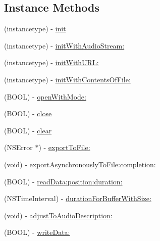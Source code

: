 \subsection*{Instance Methods}
\begin{DoxyCompactItemize}
\item 
(instancetype) -\/ \hyperlink{interface_s_e_audio_stream_a3399ff27e1d1189946e698ebd1449d08}{init}
\item 
(instancetype) -\/ \hyperlink{interface_s_e_audio_stream_abe3e88c47e7d46b1d8d041c70cef8305}{init\-With\-Audio\-Stream\-:}
\item 
(instancetype) -\/ \hyperlink{interface_s_e_audio_stream_a036f98d5a2373bb2eb5e223cfde0cdae}{init\-With\-U\-R\-L\-:}
\item 
(instancetype) -\/ \hyperlink{interface_s_e_audio_stream_a518443753d9748fb80a4811c69dac1ce}{init\-With\-Contents\-Of\-File\-:}
\item 
(B\-O\-O\-L) -\/ \hyperlink{interface_s_e_audio_stream_acff6e63be14a361a5b0ac065170a843d}{open\-With\-Mode\-:}
\item 
(B\-O\-O\-L) -\/ \hyperlink{interface_s_e_audio_stream_af2cf137df7939dea6d1003ff00f7af02}{close}
\item 
(B\-O\-O\-L) -\/ \hyperlink{interface_s_e_audio_stream_a7a808893a77d0fb9ad960563d75a822b}{clear}
\item 
(N\-S\-Error $\ast$) -\/ \hyperlink{interface_s_e_audio_stream_a6300968768eeb9d47dda0aa21748b2ed}{export\-To\-File\-:}
\item 
(void) -\/ \hyperlink{interface_s_e_audio_stream_add18c4dadc3625b3e22cb4e9e105d03e}{export\-Asynchronously\-To\-File\-:completion\-:}
\item 
(B\-O\-O\-L) -\/ \hyperlink{interface_s_e_audio_stream_a282b3ff513e91b82eb0da34d723dbcd0}{read\-Data\-:position\-:duration\-:}
\item 
(N\-S\-Time\-Interval) -\/ \hyperlink{interface_s_e_audio_stream_a9c310c1951f40e16cfd429be70730b27}{duration\-For\-Buffer\-With\-Size\-:}
\item 
(void) -\/ \hyperlink{interface_s_e_audio_stream_adfdf1dbe3671da136d6cdae4fe4256bc}{adjust\-To\-Audio\-Description\-:}
\item 
(B\-O\-O\-L) -\/ \hyperlink{interface_s_e_audio_stream_a72236de5f14e8c3494be78f310d4282a}{write\-Data\-:}
\end{DoxyCompactItemize}
